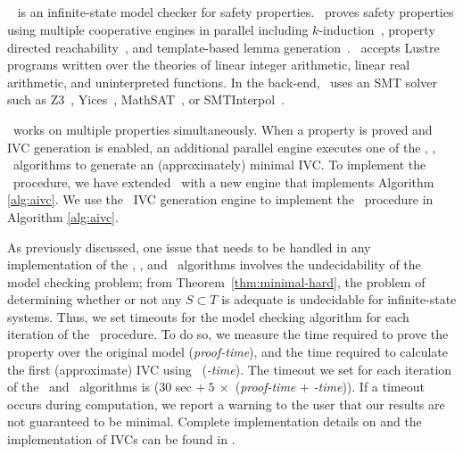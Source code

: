 \subsection{\jkind}

\jkind~\cite{jkind} is an infinite-state model checker for safety
properties. \jkind\ proves safety properties using multiple cooperative
engines in parallel including $k$-induction~\cite{SheeranSS00},
property directed reachability~\cite{Een2011:PDR}, and template-based
lemma generation~\cite{Kahsai2011}. \jkind\ accepts Lustre programs
written over the theories of linear integer arithmetic, linear real arithmetic, and uninterpreted functions. In the
back-end, \jkind\ uses an SMT solver such as Z3~\cite{DeMoura08:z3},
Yices~\cite{Dutertre06:yices}, MathSAT~\cite{Cimatti2013:MathSAT}, or
SMTInterpol~\cite{Christ2012:SMTInterpol}.

\jkind\ works on multiple properties simultaneously.  When a property is
proved and IVC generation is enabled, an additional parallel engine
executes one of the {\ucalg, \bfalg, \ucbfalg}~algorithms \cite{Ghass16} to generate an (approximately) minimal IVC.  To implement the \aivcalg\ procedure, we have extended \jkind\ with a new engine that implements Algorithm \ref{alg:aivc}.
We use the \jkind\ IVC generation engine to implement the \getivc\ procedure in  Algorithm \ref{alg:aivc}.



As previously discussed, one issue that needs to
be handled in any implementation of the \ucalg, \ucbfalg, and \aivcalg~algorithms involves the undecidability of the model checking problem;
from Theorem~\ref{thm:minimal-hard}, the problem of determining whether or not any $S \subset T$ is adequate is undecidable for infinite-state systems. Thus, we set  timeouts for the model checking algorithm for each iteration of the \aivcalg\ procedure.
To do so, we measure the time required to prove the property over the original model (\emph{proof-time}), and the time required to calculate the first
(approximate) IVC using \ucalg\ (\emph{\ucalg-time}).
The timeout we set for each iteration of the \ucbfalg\ and \aivcalg\ algorithms is ($30$ sec  $+\ 5\ \times$ (\emph{proof-time} $+$ \emph{\ucalg-time})).
%
If a timeout occurs during computation, we report a warning to the user that our results are not guaranteed to be minimal.  %
Complete implementation details on \jkind and the implementation of IVCs can be found in \cite{elathesis}.


